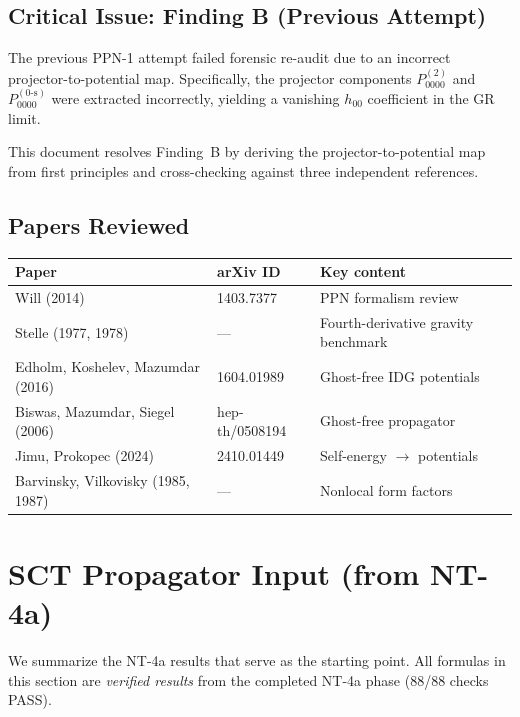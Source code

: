 \documentclass[11pt,a4paper]{article}
\theoremstyle{plain}
\theoremstyle{definition}
\theoremstyle{remark}
\begin{document}
\subsection{Critical Issue: Finding B (Previous Attempt)}

The previous PPN-1 attempt failed forensic re-audit due to an incorrect
projector-to-potential map.  Specifically, the projector components
$P^{(2)}_{0000}$ and $P^{(0\text{-s})}_{0000}$ were extracted
incorrectly, yielding a vanishing $h_{00}$ coefficient in the GR limit.

This document resolves Finding~B by deriving the projector-to-potential
map from first principles and cross-checking against three independent
references.

\subsection{Papers Reviewed}

\begin{center}
\begin{tabular}{lll}
\toprule
Paper & arXiv ID & Key content \\
\midrule
Will (2014) & 1403.7377 & PPN formalism review \\
Stelle (1977, 1978) & --- & Fourth-derivative gravity benchmark \\
Edholm, Koshelev, Mazumdar (2016) & 1604.01989 & Ghost-free IDG potentials \\
Biswas, Mazumdar, Siegel (2006) & hep-th/0508194 & Ghost-free propagator \\
Jimu, Prokopec (2024) & 2410.01449 & Self-energy $\to$ potentials \\
Barvinsky, Vilkovisky (1985, 1987) & --- & Nonlocal form factors \\
\bottomrule
\end{tabular}
\end{center}

\section{SCT Propagator Input (from NT-4a)}\label{sec:sct-input}

We summarize the NT-4a results that serve as the starting point.
All formulas in this section are \emph{verified results} from the
completed NT-4a phase (88/88 checks PASS).
\end{document}
